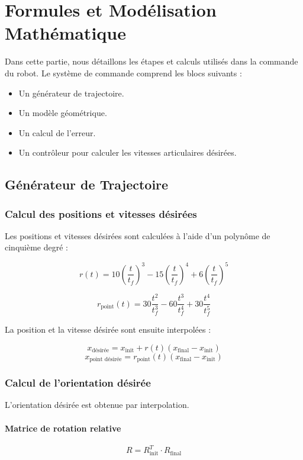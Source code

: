 \documentclass[a4paper,12pt]{article}
\begin{document}
\section{Formules et Modélisation Mathématique}
Dans cette partie, nous détaillons les étapes et calculs utilisés dans la commande du robot.  
Le système de commande comprend les blocs suivants :
\begin{itemize}
    \item Un générateur de trajectoire.
    \item Un modèle géométrique.
    \item Un calcul de l'erreur.
    \item Un contrôleur pour calculer les vitesses articulaires désirées.
\end{itemize}

\subsection{Générateur de Trajectoire}
\subsubsection{Calcul des positions et vitesses désirées}
Les positions et vitesses désirées sont calculées à l'aide d'un polynôme de cinquième degré :

\[
r(t) = 10 \left( \frac{t}{t_f} \right)^3 - 15 \left( \frac{t}{t_f} \right)^4 + 6 \left( \frac{t}{t_f} \right)^5
\]

\[
r_{\text{point}}(t) = 30 \frac{t^2}{t_f^3} - 60 \frac{t^3}{t_f^4} + 30 \frac{t^4}{t_f^5}
\]

La position et la vitesse désirée sont ensuite interpolées :

\[
x_{\text{désirée}} = x_{\text{init}} + r(t) (x_{\text{final}} - x_{\text{init}})
\]
\[
x_{\text{point désirée}} = r_{\text{point}}(t) (x_{\text{final}} - x_{\text{init}})
\]

\subsubsection{Calcul de l'orientation désirée}
L'orientation désirée est obtenue par interpolation.  

\paragraph{Matrice de rotation relative}
\[
R = R_{\text{init}}^T \cdot R_{\text{final}}
\]
\end{document}
